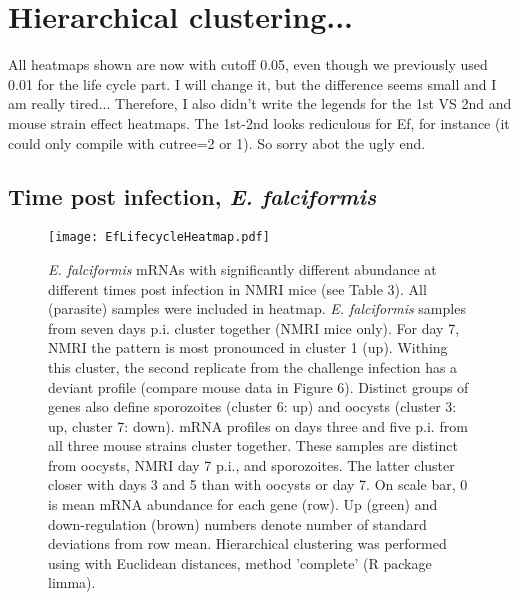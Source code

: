 \documentclass{article}
\begin{document}
\section{Hierarchical clustering...}
All heatmaps shown are now with cutoff 0.05, even though we previously used 0.01 for the life cycle part. I will change it, but the difference seems small and I am really tired... Therefore, I also didn't write the legends for the 1st VS 2nd and mouse strain effect heatmaps. The 1st-2nd looks rediculous for Ef, for instance (it could only compile with cutree=2 or 1). So sorry abot the ugly end.
\subsection{Time post infection, \textit{E. falciformis}}
\begin{figure}[H]
\centering
	\texttt{[image: EfLifecycleHeatmap.pdf]}  
	\caption{\textit{E. falciformis} mRNAs with significantly different abundance at different times post infection in NMRI mice (see Table 3). All (parasite) samples were included in heatmap. \textit{E. falciformis} samples from seven days p.i. cluster together (NMRI mice only). For day 7, NMRI the pattern is most pronounced in cluster 1 (up). Withing this cluster, the second replicate from the challenge infection has a deviant profile (compare mouse data in Figure 6). Distinct groups of genes also define sporozoites (cluster 6: up) and oocysts (cluster 3: up, cluster 7: down). mRNA profiles on days three and five p.i. from all three mouse strains cluster together. These samples are distinct from oocysts, NMRI day 7 p.i., and sporozoites. The latter cluster closer with days 3 and 5 than with oocysts or day 7. On scale bar, 0 is mean mRNA abundance for each gene (row). Up (green) and down-regulation (brown) numbers denote number of standard deviations from row mean. Hierarchical clustering was performed using with Euclidean distances, method 'complete' (R package limma).}
\end{figure}
\end{document}
